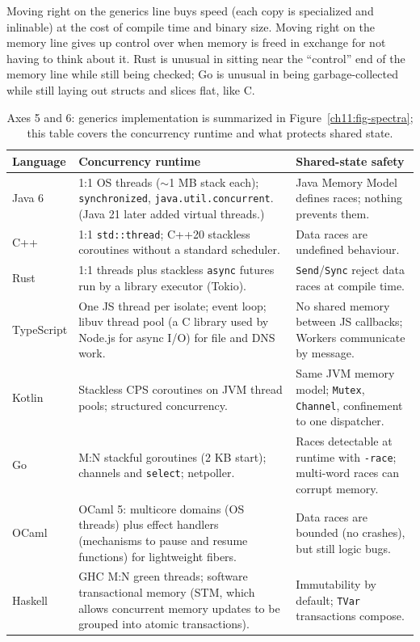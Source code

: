 Moving right on the generics line buys speed (each copy is specialized and inlinable) at the cost of compile time and binary size. Moving right on the memory line gives up control over when memory is freed in exchange for not having to think about it. Rust is unusual in sitting near the ``control'' end of the memory line while still being checked; Go is unusual in being garbage-collected while still laying out structs and slices flat, like C.

\begin{table}[H]
\centering
\small
\begin{tabular}{@{}p{1.9cm}p{6.1cm}p{6.3cm}@{}}
\toprule
\textbf{Language} & \textbf{Concurrency runtime} & \textbf{Shared-state safety} \\
\midrule
Java 6 & 1:1 OS threads ($\sim$1 MB stack each); \texttt{synchronized}, \texttt{java.util.concurrent}. (Java 21 later added virtual threads.) & Java Memory Model defines races; nothing prevents them. \\
C++ & 1:1 \texttt{std::thread}; C++20 stackless coroutines without a standard scheduler. & Data races are undefined behaviour. \\
Rust & 1:1 threads plus stackless \texttt{async} futures run by a library executor (Tokio). & \texttt{Send}/\texttt{Sync} reject data races at compile time. \\
TypeScript & One JS thread per isolate; event loop; libuv thread pool (a C library used by Node.js for async I/O) for file and DNS work. & No shared memory between JS callbacks; Workers communicate by message. \\
Kotlin & Stackless CPS coroutines on JVM thread pools; structured concurrency. & Same JVM memory model; \texttt{Mutex}, \texttt{Channel}, confinement to one dispatcher. \\
Go & M:N stackful goroutines (2 KB start); channels and \texttt{select}; netpoller. & Races detectable at runtime with \texttt{-race}; multi-word races can corrupt memory. \\
OCaml & OCaml 5: multicore domains (OS threads) plus effect handlers (mechanisms to pause and resume functions) for lightweight fibers. & Data races are bounded (no crashes), but still logic bugs. \\
Haskell & GHC M:N green threads; software transactional memory (STM, which allows concurrent memory updates to be grouped into atomic transactions). & Immutability by default; \texttt{TVar} transactions compose. \\
\bottomrule
\end{tabular}
\caption{Axes 5 and 6: generics implementation is summarized in Figure~\ref{ch11:fig-spectra}; this table covers the concurrency runtime and what protects shared state.}
\label{ch11:tab-concurrency}
\end{table}

